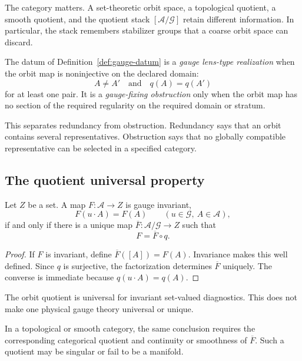 \documentclass[11pt]{article}
\newcommand{\Conn}{\mathcal A}
\newcommand{\Gg}{\mathcal G}
\begin{document}
The category matters.  A set-theoretic orbit space, a topological quotient, a
smooth quotient, and the quotient stack $[\Conn/\Gg]$ retain different
information.  In particular, the stack remembers stabilizer groups that a
coarse orbit space can discard.

\begin{definition}\label{def:lens}
The datum of Definition~\ref{def:gauge-datum} is a \emph{gauge lens-type
realization} when the orbit map is noninjective on the declared domain:
\[
 A\ne A'\quad\text{and}\quad q(A)=q(A')
\]
for at least one pair.  It is a \emph{gauge-fixing obstruction} only when the
orbit map has no section of the required regularity on the required domain or
stratum.
\end{definition}

This separates redundancy from obstruction.  Redundancy says that an orbit
contains several representatives.  Obstruction says that no globally
compatible representative can be selected in a specified category.

\subsection{The quotient universal property}

\begin{theorem}\label{thm:quotient}
Let $Z$ be a set.  A map $F:\Conn\to Z$ is gauge invariant,
\[
 F(u\cdot A)=F(A)
 \qquad
 (u\in\Gg,\ A\in\Conn),
\]
if and only if there is a unique map
$\overline F:\Conn/\Gg\to Z$ such that
\[
 F=\overline F\circ q.
\]
\end{theorem}

\begin{proof}
If $F$ is invariant, define $\overline F([A])=F(A)$.  Invariance makes this
well defined.  Since $q$ is surjective, the factorization determines
$\overline F$ uniquely.  The converse is immediate because
$q(u\cdot A)=q(A)$.
\end{proof}

\begin{corollary}
The orbit quotient is universal for invariant set-valued diagnostics.  This
does not make one physical gauge theory universal or unique.
\end{corollary}

In a topological or smooth category, the same conclusion requires the
corresponding categorical quotient and continuity or smoothness of
$\overline F$.  Such a quotient may be singular or fail to be a manifold.
\end{document}
